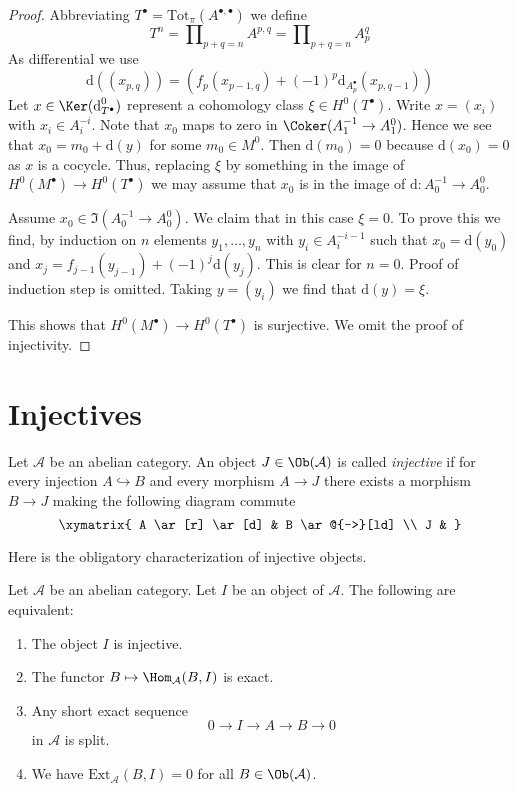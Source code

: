 \begin{proof}
Abbreviating $T^\bullet = \text{Tot}_\pi(A^{\bullet, \bullet})$
we define
$$
T^n = \prod\nolimits_{p + q = n} A^{p, q} =
\prod\nolimits_{p + q = n} A_p^q
$$
As differential we use
$$
\text{d}((x_{p, q})) =
(f_p(x_{p - 1, q}) + (-1)^p\text{d}_{A_p^\bullet}(x_{p, q - 1}))
$$
Let $x \in \Ker(\text{d}_{T^\bullet}^0)$ represent a cohomology
class $\xi \in H^0(T^\bullet)$. Write $x = (x_i)$ with $x_i \in A_i^{-i}$.
Note that $x_0$ maps to zero in $\Coker(A_1^{-1} \to A_1^0)$.
Hence we see that $x_0 = m_0 + \text{d}(y)$ for some $m_0 \in M^0$.
Then $\text{d}(m_0) = 0$ because $\text{d}(x_0) = 0$ as $x$
is a cocycle. Thus, replacing $\xi$ by something in the image of
$H^0(M^\bullet) \to H^0(T^\bullet)$ we may assume that $x_0$
is in the image of $\text{d} : A_0^{-1} \to A_0^0$.

\medskip\noindent
Assume $x_0 \in \Im(A_0^{-1} \to A_0^0)$. We claim that in this
case $\xi = 0$. To prove this we find, by induction on $n$ elements
$y_1, \ldots, y_n$ with $y_i \in A_i^{-i - 1}$ such that
$x_0 = \text{d}(y_0)$ and $x_j = f_{j - 1}(y_{j - 1}) + (-1)^j\text{d}(y_j)$.
This is clear for $n = 0$. Proof of induction step is omitted.
Taking $y = (y_i)$ we find that $\text{d}(y) = \xi$.

\medskip\noindent
This shows that $H^0(M^\bullet) \to H^0(T^\bullet)$ is surjective.
We omit the proof of injectivity.
\end{proof}






\section{Injectives}
\label{section-injectives}

\begin{definition}
\label{definition-injective}
Let $\mathcal{A}$ be an abelian category.
An object $J \in \Ob(\mathcal{A})$ is
called {\it injective} if for every injection
$A \hookrightarrow B$ and every morphism
$A \to J$ there exists a morphism $B \to J$ making
the following diagram commute
$$
\xymatrix{
A \ar[r] \ar[d] & B \ar@{-->}[ld] \\
J &
}
$$
\end{definition}

\noindent
Here is the obligatory characterization of injective objects.

\begin{lemma}
\label{lemma-characterize-injectives}
Let $\mathcal{A}$ be an abelian category.
Let $I$ be an object of $\mathcal{A}$.
The following are equivalent:
\begin{enumerate}
\item The object $I$ is injective.
\item The functor $B \mapsto \Hom_\mathcal{A}(B, I)$
is exact.
\item Any short exact sequence
$$
0 \to I \to A \to B \to 0
$$
in $\mathcal{A}$ is split.
\item We have $\text{Ext}_\mathcal{A}(B, I) = 0$ for
all $B \in \Ob(\mathcal{A})$.
\end{enumerate}
\end{lemma}

